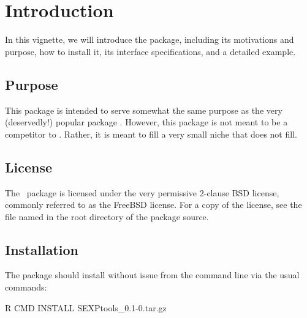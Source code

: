 \section{Introduction}

In this vignette, we will introduce the \thispackage package, including its 
motivations and purpose, how to install it, its interface specifications, and a 
detailed 
example.


\subsection{Purpose}
This package is intended to serve somewhat the same purpose as the very 
(deservedly!) popular package .  However, this package is not meant
to be a competitor to .  Rather, it is meant to fill a very small niche
that  does not fill.


\subsection{License}

The \thispackage\ package is licensed under the very permissive 2-clause BSD 
license, commonly referred to as the FreeBSD license.  For a copy of the license,
see the file named  in the root directory of the package source.


\subsection{Installation}

The package should install without issue from the command line via the usual 
commands:
\begin{Command}
R CMD INSTALL SEXPtools_0.1-0.tar.gz
\end{Command}
